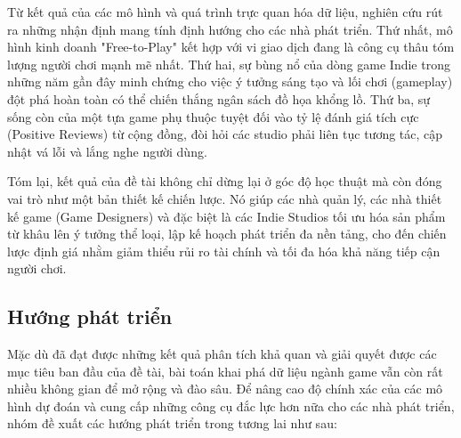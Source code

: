 \hspace{1cm} Từ kết quả của các mô hình và quá trình trực quan hóa dữ liệu, nghiên cứu rút ra những nhận định mang tính định hướng cho các nhà phát triển. Thứ nhất, mô hình kinh doanh "Free-to-Play" kết hợp với vi giao dịch đang là công cụ thâu tóm lượng người chơi mạnh mẽ nhất. Thứ hai, sự bùng nổ của dòng game Indie trong những năm gần đây minh chứng cho việc ý tưởng sáng tạo và lối chơi (gameplay) đột phá hoàn toàn có thể chiến thắng ngân sách đồ họa khổng lồ. Thứ ba, sự sống còn của một tựa game phụ thuộc tuyệt đối vào tỷ lệ đánh giá tích cực (Positive Reviews) từ cộng đồng, đòi hỏi các studio phải liên tục tương tác, cập nhật vá lỗi và lắng nghe người dùng. 

\hspace{1cm} Tóm lại, kết quả của đề tài không chỉ dừng lại ở góc độ học thuật mà còn đóng vai trò như một bản thiết kế chiến lược. Nó giúp các nhà quản lý, các nhà thiết kế game (Game Designers) và đặc biệt là các Indie Studios tối ưu hóa sản phẩm từ khâu lên ý tưởng thể loại, lập kế hoạch phát triển đa nền tảng, cho đến chiến lược định giá nhằm giảm thiểu rủi ro tài chính và tối đa hóa khả năng tiếp cận người chơi.

\subsection{Hướng phát triển}
\hspace{1cm} Mặc dù đã đạt được những kết quả phân tích khả quan và giải quyết được các mục tiêu ban đầu của đề tài, bài toán khai phá dữ liệu ngành game vẫn còn rất nhiều không gian để mở rộng và đào sâu. Để nâng cao độ chính xác của các mô hình dự đoán và cung cấp những công cụ đắc lực hơn nữa cho các nhà phát triển, nhóm đề xuất các hướng phát triển trong tương lai như sau:

